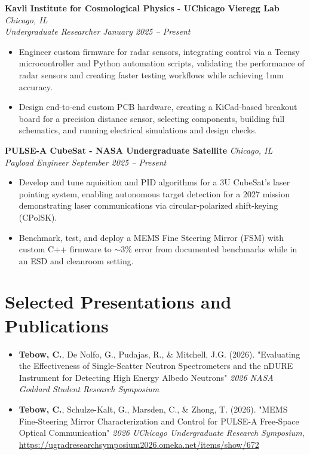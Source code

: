 \documentclass[10pt]{article}
\begin{document}
\textbf{Kavli Institute for Cosmological Physics - UChicago Vieregg Lab} \hfill \emph{Chicago, IL} \\
\emph{Undergraduate Researcher} \hfill \emph{January 2025 – Present}
\begin{itemize}
\item Engineer custom firmware for radar sensors, integrating control via a Teensy microcontroller and Python automation scripts, validating the performance of radar sensors and creating faster testing workflows while achieving 1mm accuracy.
\item Design end-to-end custom PCB hardware, creating a KiCad-based breakout board for a precision distance sensor, selecting components, building full schematics, and running electrical simulations and design checks.
\end{itemize}

\textbf{PULSE-A CubeSat - NASA Undergraduate Satellite} \hfill \emph{Chicago, IL} \\
\emph{Payload Engineer} \hfill \emph{September 2025 – Present}
\begin{itemize}
\item Develop and tune aquisition and PID algorithms for a 3U CubeSat’s laser pointing system, enabling autonomous target detection for a 2027 mission demonstrating laser communications via circular-polarized shift-keying (CPolSK).
\item Benchmark, test, and deploy a MEMS Fine Steering Mirror (FSM) with custom C++ firmware to $\sim$3\% error from documented benchmarks while in an ESD and cleanroom setting.
\end{itemize}


\section*{Selected Presentations and Publications}
\begin{itemize}[leftmargin=1.5em]
    \item \textbf{Tebow, C.},  De Nolfo, G., Pudajas, R., \& Mitchell, J.G. (2026). "Evaluating the Effectiveness of Single-Scatter Neutron Spectrometers and the nDURE Instrument for Detecting High Energy Albedo Neutrons" \textit{2026 NASA Goddard Student Research Symposium}
    \item \textbf{Tebow, C.},  Schulze-Kalt, G., Marsden, C., \& Zhong, T. (2026). "MEMS Fine‑Steering Mirror Characterization and Control for PULSE‑A Free‑Space Optical Communication" \textit{2026 UChicago Undergraduate Research Symposium}, \href{https://ugradresearchsymposium2026.omeka.net/items/show/672}{https://ugradresearchsymposium2026.omeka.net/items/show/672}
\end{itemize}
\end{document}
